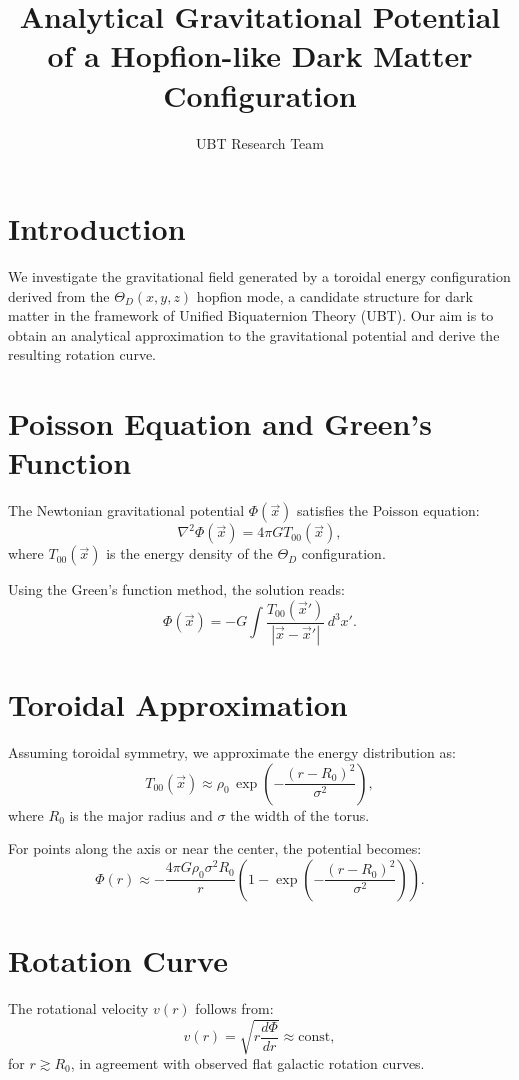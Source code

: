 \documentclass[12pt]{article}
\title{Analytical Gravitational Potential of a Hopfion-like Dark Matter Configuration}
\author{UBT Research Team}
\date{}
\begin{document}
\maketitle

\section*{Introduction}

We investigate the gravitational field generated by a toroidal energy configuration derived from the $\Theta_D(x, y, z)$ hopfion mode, a candidate structure for dark matter in the framework of Unified Biquaternion Theory (UBT). Our aim is to obtain an analytical approximation to the gravitational potential and derive the resulting rotation curve.

\section*{Poisson Equation and Green's Function}

The Newtonian gravitational potential $\Phi(\vec{x})$ satisfies the Poisson equation:
\[
\nabla^2 \Phi(\vec{x}) = 4\pi G T_{00}(\vec{x}),
\]
where $T_{00}(\vec{x})$ is the energy density of the $\Theta_D$ configuration.

Using the Green's function method, the solution reads:
\[
\Phi(\vec{x}) = -G \int \frac{T_{00}(\vec{x}')}{|\vec{x} - \vec{x}'|} \, d^3x'.
\]

\section*{Toroidal Approximation}

Assuming toroidal symmetry, we approximate the energy distribution as:
\[
T_{00}(\vec{x}) \approx \rho_0 \, \exp\left(- \frac{(r - R_0)^2}{\sigma^2} \right),
\]
where $R_0$ is the major radius and $\sigma$ the width of the torus.

For points along the axis or near the center, the potential becomes:
\[
\Phi(r) \approx -\frac{4\pi G \rho_0 \sigma^2 R_0}{r} \left(1 - \exp\left(-\frac{(r - R_0)^2}{\sigma^2}\right)\right).
\]

\section*{Rotation Curve}

The rotational velocity $v(r)$ follows from:
\[
v(r) = \sqrt{r \frac{d\Phi}{dr}} \approx \text{const},
\]
for $r \gtrsim R_0$, in agreement with observed flat galactic rotation curves.
\end{document}
